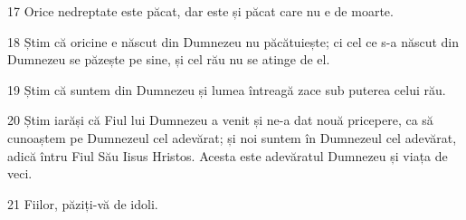 \par 17 Orice nedreptate este păcat, dar este și păcat care nu e de moarte.
\par 18 Știm că oricine e născut din Dumnezeu nu păcătuiește; ci cel ce s-a născut din Dumnezeu se păzește pe sine, și cel rău nu se atinge de el.
\par 19 Știm că suntem din Dumnezeu și lumea întreagă zace sub puterea celui rău.
\par 20 Știm iarăși că Fiul lui Dumnezeu a venit și ne-a dat nouă pricepere, ca să cunoaștem pe Dumnezeul cel adevărat; și noi suntem în Dumnezeul cel adevărat, adică întru Fiul Său Iisus Hristos. Acesta este adevăratul Dumnezeu și viața de veci.
\par 21 Fiilor, păziți-vă de idoli.


